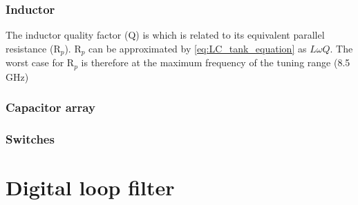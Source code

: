 \subsubsection{Inductor}
The inductor quality factor (Q) is  which is related to its equivalent parallel resistance (R$_p$). R$_p$ can be approximated by
\eqref{eq:LC_tank_equation} as $L\omega Q$. The worst case for R$_p$ is therefore at the maximum frequency of the tuning range (8.5 GHz)


\subsubsection{Capacitor array}

\subsubsection{Switches}



\section{Digital loop filter}
